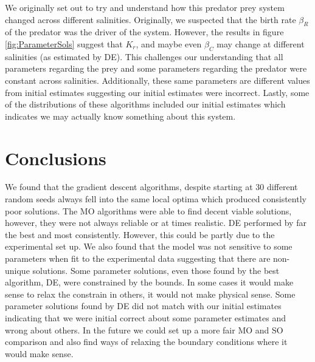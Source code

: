 \documentclass[twocolumn, 9pt]{article}
\begin{document}
\indent{} We originally set out to try and understand how this predator prey system changed across different salinities. Originally, we suspected that the birth rate $\beta_R$ of the predator was the driver of the system. However, the results in figure \ref{fig:ParameterSols} suggest that $K_r$, and maybe even $\beta_C$ may change at different salinities (as estimated by DE). This challenges our understanding that all parameters regarding the prey and some parameters regarding the predator were constant across salinities. Additionally, these same parameters are different values from initial estimates suggesting our initial estimates were incorrect. Lastly, some of the distributions of these algorithms included our initial estimates which indicates we may actually know something about this system.

\section{Conclusions}
\indent{} We found that the gradient descent algorithms, despite starting at 30 different random seeds always fell into the same local optima which produced consistently poor solutions. The MO algorithms were able to find decent viable solutions, however, they were not always reliable or at times realistic. DE performed by far the best and most consistently. However, this could be partly due to the experimental set up. We also found that the model was not sensitive to some parameters when fit to the experimental data suggesting that there are non-unique solutions. Some parameter solutions, even those found by the best algorithm, DE, were constrained by the bounds. In some cases it would make sense to relax the constrain in others, it would not make physical sense. Some parameter solutions found by DE did not match with our initial estimates indicating that we were initial correct about some parameter estimates and wrong about others. In the future we could set up a more fair MO and SO comparison and also find ways of relaxing the boundary conditions where it would make sense.
{\footnotesize

}
\end{document}
